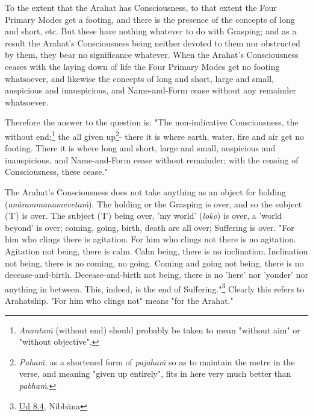To the extent that the Arahat has Consciousness, to that extent the Four
Primary Modes get a footing, and there is the presence of the concepts
of long and short, etc. But these have nothing whatever to do with
Grasping; and as a result the Arahat’s Consciousness being neither
devoted to them nor obstructed by them, they bear no significance
whatever. When the Arahat’s Consciousness ceases with the laying down of
life the Four Primary Modes get no footing whatsoever, and likewise the
concepts of long and short, large and small, auspicious and
inauspicious, and Name-and-Form cease without any remainder whatsoever.


Therefore the answer to the question is: "The non-indicative
Consciousness, the without end;\footnote{\emph{Anantaṁ} (without end) should probably be taken to mean "without aim" or "without objective".} the all
given up\footnote{\emph{Pahaṁ}, as a shortened form of \emph{pajahaṁ} so as to maintain the metre in the verse, and meaning "given up entirely", fits in here very much better than \emph{pabhaṁ}.}- there it is where earth, water,
fire and air get no footing. There it is where long and short, large and
small, auspicious and inauspicious, and Name-and-Form cease without
remainder; with the ceasing of Consciousness, these cease."


The Arahat’s Consciousness does not take anything as an object for
holding (\emph{anārammanamevetaṁ}). The holding or the Grasping is over,
and so the subject ('I') is over. The subject ('I') being over, 'my
world' (\emph{loko}) is over, a 'world beyond' is over; coming, going,
birth, death are all over; Suffering is over. "For him who clings there
is agitation. For him who clings not there is no agitation. Agitation
not being, there is calm. Calm being, there is no inclination.
Inclination not being, there is no coming, no going. Coming and going
not being, there is no decease-and-birth. Decease-and-birth not being,
there is no 'here' nor 'yonder' nor anything in between. This, indeed,
is the end of Suffering."\footnote{\href{https://suttacentral.net/ud8.4/en/anandajoti}{Ud 8.4}, Nibbāna}
Clearly this refers to Arahatship. "For him who clings not" means
"for the Arahat."



